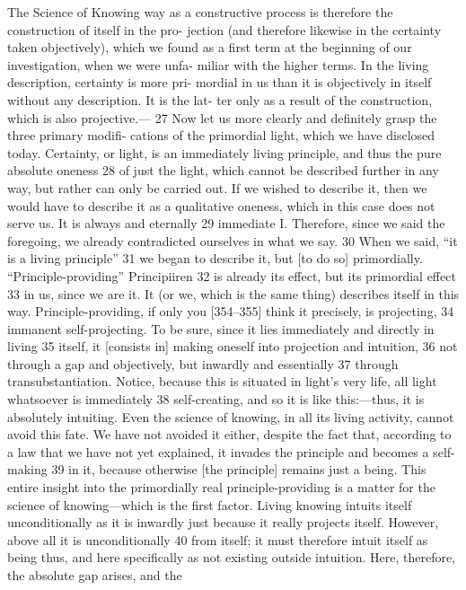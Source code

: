 The Science of Knowing
way as a constructive process is therefore the construction of itself in the pro-
jection (and therefore likewise in the certainty taken objectively), which we
found as a first term at the beginning of our investigation, when we were unfa-
miliar with the higher terms. In the living description, certainty is more pri-
mordial in us than it is objectively in itself without any description. It is the lat-
ter only as a result of the construction, which is also projective.— 27
Now let us more clearly and definitely grasp the three primary modifi-
cations of the primordial light, which we have disclosed today.
Certainty, or light, is an immediately living principle, and thus the pure
absolute oneness 28 of just the light, which cannot be described further in any
way, but rather can only be carried out. If we wished to describe it, then we
would have to describe it as a qualitative oneness, which in this case does not
serve us. It is always and eternally 29 immediate I. Therefore, since we said the
foregoing, we already contradicted ourselves in what we say. 30 When we said,
“it is a living principle” 31 we began to describe it, but [to do so] primordially.
“Principle-providing” {Principiiren} 32 is already its effect, but its primordial
effect 33 in us, since we are it. It (or we, which is the same thing) describes itself
in this way. Principle-providing, if only you [354–355] think it precisely, is
projecting, 34 immanent self-projecting. To be sure, since it lies immediately and
directly in living 35 itself, it [consists in] making oneself into projection and
intuition, 36 not through a gap and objectively, but inwardly and essentially 37
through transubstantiation. Notice, because this is situated in light’s very life,
all light whatsoever is immediately 38 self-creating, and so it is like this:—thus,
it is absolutely intuiting. Even the science of knowing, in all its living activity,
cannot avoid this fate. We have not avoided it either, despite the fact that,
according to a law that we have not yet explained, it invades the principle and
becomes a self-making 39 in it, because otherwise [the principle] remains just a
being. This entire insight into the primordially real principle-providing is a
matter for the science of knowing—which is the first factor.
Living knowing intuits itself unconditionally as it is inwardly just
because it really projects itself. However, above all it is unconditionally 40 from
itself; it must therefore intuit itself as being thus, and here specifically as not
existing outside intuition. Here, therefore, the absolute gap arises, and the
